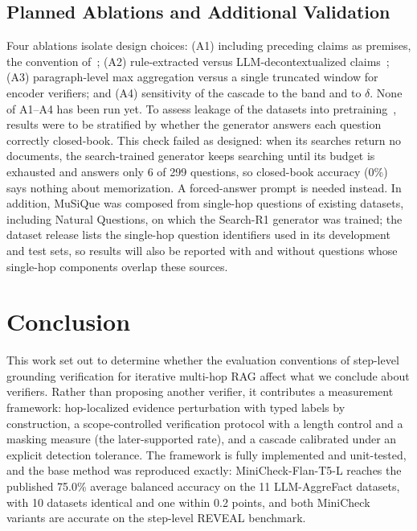 \documentclass[conference]{IEEEtran}
\begin{document}
\subsection{Planned Ablations and Additional Validation}
Four ablations isolate design choices: (A1) including preceding claims as premises, the convention of~\cite{chu2026locally,kim2026prostep}; (A2) rule-extracted versus LLM-decontextualized claims~\cite{choi2021decontext}; (A3) paragraph-level max aggregation versus a single truncated window for encoder verifiers; and (A4) sensitivity of the cascade to the band and to $\delta$. None of A1--A4 has been run yet. To assess leakage of the datasets into pretraining~\cite{sainz2023contamination}, results were to be stratified by whether the generator answers each question correctly closed-book. This check failed as designed: when its searches return no documents, the search-trained generator keeps searching until its budget is exhausted and answers only 6 of 299 questions, so closed-book accuracy (0\%) says nothing about memorization. A forced-answer prompt is needed instead. In addition, MuSiQue was composed from single-hop questions of existing datasets, including Natural Questions, on which the Search-R1 generator was trained; the dataset release lists the single-hop question identifiers used in its development and test sets, so results will also be reported with and without questions whose single-hop components overlap these sources. 

\section{Conclusion}\label{sec:conclusion}
This work set out to determine whether the evaluation conventions of step-level grounding verification for iterative multi-hop RAG affect what we conclude about verifiers. Rather than proposing another verifier, it contributes a measurement framework: hop-localized evidence perturbation with typed labels by construction, a scope-controlled verification protocol with a length control and a masking measure (the later-supported rate), and a cascade calibrated under an explicit detection tolerance. The framework is fully implemented and unit-tested, and the base method was reproduced exactly: MiniCheck-Flan-T5-L reaches the published 75.0\% average balanced accuracy on the 11 LLM-AggreFact datasets, with 10 datasets identical and one within 0.2 points, and both MiniCheck variants are accurate on the step-level REVEAL benchmark.
\end{document}
